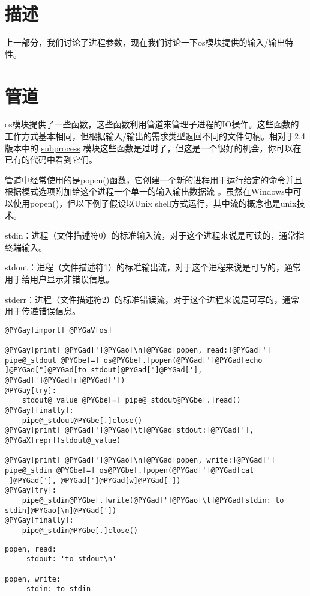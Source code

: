 \documentclass[a4paper,10pt,english]{manual}
\begin{document}
\section{描述}

上一部分，我们讨论了进程参数，现在我们讨论一下os模块提供的输入/输出特性。


\section{管道}

os模块提供了一些函数，这些函数利用管道来管理子进程的IO操作。这些函数的工作方式基本相同，但根据输入/输出的需求类型返回不同的文件句柄。相对于2.4版本中的 \href{http://docs.python.org/lib/module-subprocess.html}{subprocess} 模块这些函数是过时了，但这是一个很好的机会，你可以在已有的代码中看到它们。

管道中经常使用的是popen()函数，它创建一个新的进程用于运行给定的命令并且根据模式选项附加给这个进程一个单一的输入输出数据流 。虽然在Windows中可以使用popen()，但以下例子假设以Unix shell方式运行，其中流的概念也是unix技术。

stdin：进程（文件描述符0）的标准输入流，对于这个进程来说是可读的，通常指终端输入。

stdout：进程（文件描述符1）的标准输出流，对于这个进程来说是可写的，通常用于给用户显示非错误信息。

stderr：进程（文件描述符2）的标准错误流，对于这个进程来说是可写的，通常用于传递错误信息。

\begin{Verbatim}[commandchars=@\[\]]
@PYGay[import] @PYGaV[os]

@PYGay[print] @PYGad[']@PYGao[\n]@PYGad[popen, read:]@PYGad[']
pipe@_stdout @PYGbe[=] os@PYGbe[.]popen(@PYGad[']@PYGad[echo ]@PYGad["]@PYGad[to stdout]@PYGad["]@PYGad['], @PYGad[']@PYGad[r]@PYGad['])
@PYGay[try]:
    stdout@_value @PYGbe[=] pipe@_stdout@PYGbe[.]read()
@PYGay[finally]:
    pipe@_stdout@PYGbe[.]close()
@PYGay[print] @PYGad[']@PYGao[\t]@PYGad[stdout:]@PYGad['], @PYGaX[repr](stdout@_value)

@PYGay[print] @PYGad[']@PYGao[\n]@PYGad[popen, write:]@PYGad[']
pipe@_stdin @PYGbe[=] os@PYGbe[.]popen(@PYGad[']@PYGad[cat -]@PYGad['], @PYGad[']@PYGad[w]@PYGad['])
@PYGay[try]:
    pipe@_stdin@PYGbe[.]write(@PYGad[']@PYGao[\t]@PYGad[stdin: to stdin]@PYGao[\n]@PYGad['])
@PYGay[finally]:
    pipe@_stdin@PYGbe[.]close()
\end{Verbatim}

\begin{Verbatim}[commandchars=@\[\]]
popen, read:
     stdout: 'to stdout\n'

popen, write:
     stdin: to stdin
\end{Verbatim}
\end{document}
